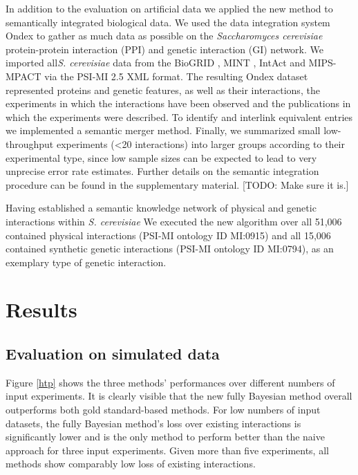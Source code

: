 \documentclass{bioinfo}
\newcommand{\species}[1]{\textit{#1}}
\newcommand{\note}[1]{{\color{red}[#1]}}
\begin{document}
\begin{methods}
In addition to the evaluation on artificial data we applied the new method to semantically integrated biological data. We used the data integration system Ondex \citep{koehler_graph-based_2006} to gather as much data as possible on the \species{Saccharomyces cerevisiae} protein-protein interaction (PPI) and genetic interaction (GI) network. We imported all\species{S. cerevisiae} data from the BioGRID \citep{breitkreutz_biogrid_2008}, MINT \citep{chatr-aryamontri_mint:_2007}, IntAct \citep{hermjakob_intact:_2004} and MIPS-MPACT \citep{guldener_mpact:_2006} via the PSI-MI 2.5 XML \citep{kerrien_broadening_2007} format. The resulting Ondex dataset represented proteins and genetic features, as well as their interactions, the experiments in which the interactions have been observed and the publications in which the experiments were described. To identify and interlink equivalent entries we implemented a semantic merger method. Finally, we summarized small low-throughput experiments (<20 interactions) into larger groups according to their experimental type, since low sample sizes can be expected to lead to very unprecise error rate estimates. Further details on the semantic integration procedure can be found in the supplementary material. \note{TODO: Make sure it is.}

Having established a semantic knowledge network of physical and genetic interactions within \species{S. cerevisiae} We executed the new algorithm over all 51,006 contained physical interactions (PSI-MI ontology ID MI:0915) and all 15,006 contained synthetic genetic interactions (PSI-MI ontology ID MI:0794), as an exemplary type of genetic interaction.

\end{methods}

\section{Results}

\subsection{Evaluation on simulated data}

Figure \ref{htp} shows the three methods' performances over different numbers of input experiments. It is clearly visible that the new fully Bayesian method overall outperforms both gold standard-based methods. For low numbers of input datasets, the fully Bayesian method's loss over existing interactions is significantly lower and is the only method to perform better than the naive approach for three input experiments. Given more than five experiments, all methods show comparably low loss of existing interactions. 
\end{document}
